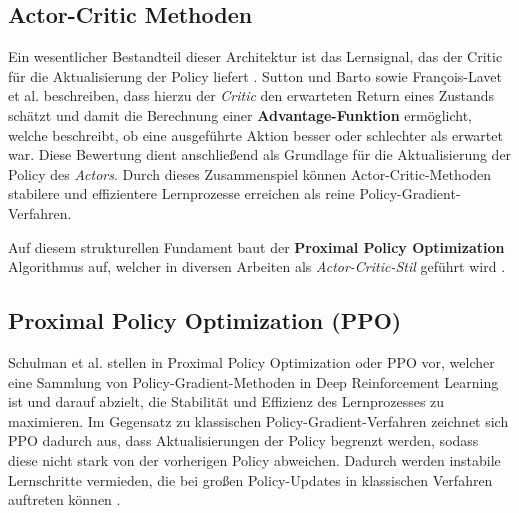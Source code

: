 \subsection{Actor-Critic Methoden}
Ein wesentlicher Bestandteil dieser Architektur ist das Lernsignal, das der Critic für die Aktualisierung der Policy liefert \cite{sutton2018reinforcement}. Sutton und Barto \cite{sutton2018reinforcement} sowie François-Lavet et al.  \cite{francois-lavetIntroductionDeepReinforcement2018} beschreiben, dass hierzu der \textit{Critic} den erwarteten Return eines Zustands schätzt und damit die Berechnung einer \textbf{Advantage-Funktion} ermöglicht, welche beschreibt, ob eine ausgeführte Aktion besser oder schlechter als erwartet war. Diese Bewertung dient anschließend als Grundlage für die Aktualisierung der Policy des \textit{Actors}. Durch dieses Zusammenspiel können Actor-Critic-Methoden stabilere und effizientere Lernprozesse erreichen als reine Policy-Gradient-Verfahren.

Auf diesem strukturellen Fundament baut der \textbf{Proximal Policy Optimization} Algorithmus auf, welcher in diversen Arbeiten als \textit{Actor-Critic-Stil} geführt wird \cite{schulmanProximalPolicyOptimization2017, jinResilientLeggedLocal2023}.
\subsection{Proximal Policy Optimization (PPO)} \label{ss:PPO}
Schulman et al. stellen in \cite{schulmanProximalPolicyOptimization2017} Proximal Policy Optimization oder PPO vor, welcher eine Sammlung von Policy-Gradient-Methoden in Deep Reinforcement Learning ist und darauf abzielt, die Stabilität und Effizienz des Lernprozesses zu maximieren. \newline
Im Gegensatz zu klassischen Policy-Gradient-Verfahren zeichnet sich PPO dadurch aus, dass Aktualisierungen der Policy begrenzt werden, sodass diese nicht stark von der vorherigen Policy abweichen. Dadurch werden instabile Lernschritte vermieden, die bei großen Policy-Updates in klassischen Verfahren auftreten können \cite{schulmanProximalPolicyOptimization2017}.
